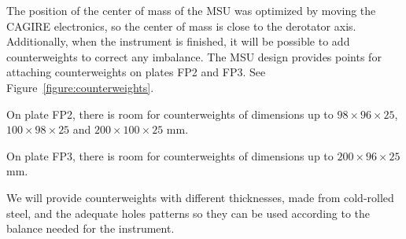 \documentclass{report}
\newcommand{\TODO}[1]{\textcolor{red}{TODO: #1}}
\begin{document}
The position of the center of mass of the MSU was optimized by moving the CAGIRE electronics, so the center of mass is close to the derotator axis. Additionally, when the instrument is finished, it will be possible to add counterweights to correct any imbalance.
The MSU design provides points for attaching counterweights on plates FP2 and FP3. See Figure~\ref{figure:counterweights}.

On plate FP2, there is room for counterweights of dimensions up to
$98 \times 96 \times 25$,
$100 \times 98 \times 25$ and 
$200 \times 100 \times 25$ mm.

On plate FP3, there is room for counterweights of dimensions up to
$200 \times 96 \times 25$ mm.

We will provide counterweights with different thicknesses, made from cold-rolled steel, and the adequate holes patterns so they can be used according to the balance needed for the instrument.


\clearpage









\end{document}
